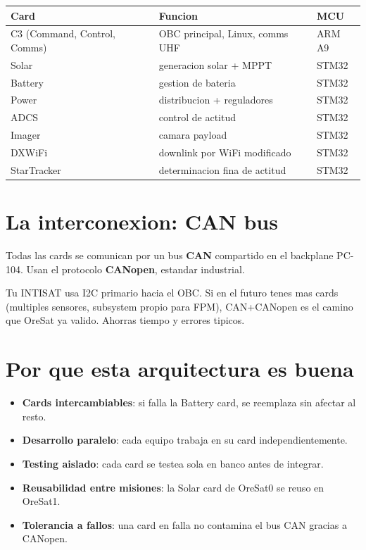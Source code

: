 \documentclass[11pt,a4paper,oneside]{report}
\begin{document}
\begin{center}
\begin{tabular}{p{4cm}p{8cm}p{2cm}}
\toprule
\textbf{Card} & \textbf{Funcion} & \textbf{MCU} \\
\midrule
C3 (Command, Control, Comms) & OBC principal, Linux, comms UHF & ARM A9 \\
Solar                        & generacion solar + MPPT          & STM32 \\
Battery                      & gestion de bateria               & STM32 \\
Power                        & distribucion + reguladores       & STM32 \\
ADCS                         & control de actitud               & STM32 \\
Imager                       & camara payload                   & STM32 \\
DXWiFi                       & downlink por WiFi modificado     & STM32 \\
StarTracker                  & determinacion fina de actitud    & STM32 \\
\bottomrule
\end{tabular}
\end{center}

\section{La interconexion: CAN bus}

Todas las cards se comunican por un bus \textbf{CAN} compartido en el
backplane PC-104. Usan el protocolo \textbf{CANopen}, estandar industrial.

\begin{leccion}
Tu INTISAT usa I2C primario hacia el OBC. Si en el futuro tenes mas
cards (multiples sensores, subsystem propio para FPM), CAN+CANopen es
el camino que OreSat ya valido. Ahorras tiempo y errores tipicos.
\end{leccion}

\section{Por que esta arquitectura es buena}

\begin{itemize}[leftmargin=2em]
  \item \textbf{Cards intercambiables}: si falla la Battery card, se
        reemplaza sin afectar al resto.
  \item \textbf{Desarrollo paralelo}: cada equipo trabaja en su card
        independientemente.
  \item \textbf{Testing aislado}: cada card se testea sola en banco
        antes de integrar.
  \item \textbf{Reusabilidad entre misiones}: la Solar card de OreSat0
        se reuso en OreSat1.
  \item \textbf{Tolerancia a fallos}: una card en falla no contamina el
        bus CAN gracias a CANopen.
\end{itemize}
\end{document}
